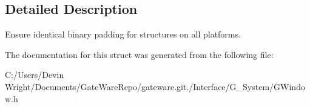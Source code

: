 \subsection{Detailed Description}
Ensure identical binary padding for structures on all platforms. 

The documentation for this struct was generated from the following file\+:\begin{DoxyCompactItemize}
\item 
C\+:/\+Users/\+Devin Wright/\+Documents/\+Gate\+Ware\+Repo/gateware.\+git./\+Interface/\+G\+\_\+\+System/G\+Window.\+h\end{DoxyCompactItemize}
